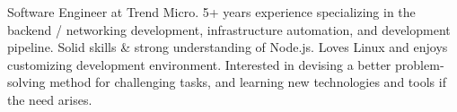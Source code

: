 \par{
Software Engineer at Trend Micro. 5+ years experience specializing in the backend / networking development, infrastructure automation, and development pipeline. Solid skills \& strong understanding of Node.js. Loves Linux and enjoys customizing development environment. Interested in devising a better problem‐solving method for challenging tasks, and learning new technologies and tools if the need arises.
}
